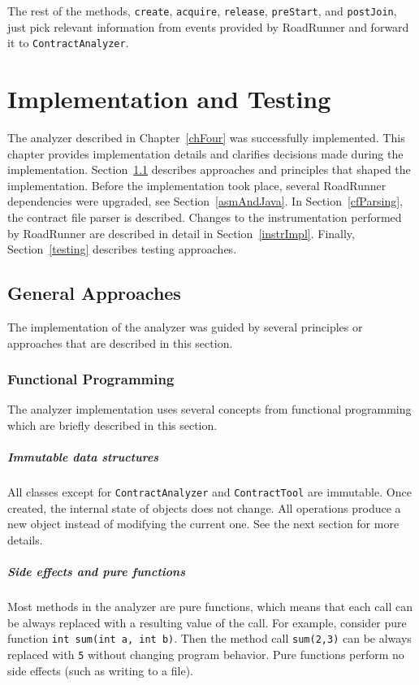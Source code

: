 The rest of the methods, \texttt{create}, \texttt{acquire}, \texttt{release},
\texttt{preStart}, and \texttt{postJoin}, just pick relevant information from
events provided by RoadRunner and forward it to \texttt{ContractAnalyzer}.



\chapter{Implementation and Testing}
\label{chFive}

The analyzer described in Chapter~\ref{chFour} was successfully implemented.
This chapter provides implementation details and clarifies decisions made during
the implementation. Section~\ref{approaches} describes approaches and principles
that shaped the implementation. Before the implementation took place, several
RoadRunner dependencies were upgraded, see Section~\ref{asmAndJava}. In
Section~\ref{cfParsing}, the contract file parser is described. Changes to the
instrumentation performed by RoadRunner are described in detail in
Section~\ref{instrImpl}. Finally, Section~\ref{testing} describes testing
approaches.

\section{General Approaches}
\label{approaches}
The implementation of the analyzer was guided by several principles or
approaches that are described in this section.

\subsection{Functional Programming}
The analyzer implementation uses several concepts from functional programming
which are briefly described in this section.

\paragraph{Immutable data structures}
All classes except for \texttt{ContractAnalyzer} and \texttt{ContractTool} are
immutable. Once created, the internal state of objects does not change. All
operations produce a new object instead of modifying the current one. See the
next section for more details.

\paragraph{Side effects and pure functions}
Most methods in the analyzer are pure functions, which means that each call can
be always replaced with a resulting value of the call. For example, consider
pure function \texttt{int sum(int a, int b)}. Then the method call
\texttt{sum(2,3)} can be always replaced with \texttt{5} without changing
program behavior. Pure functions perform no side effects (such as writing to a
file).

